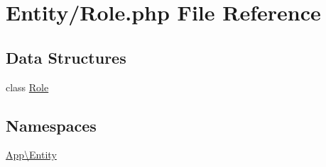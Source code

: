 \hypertarget{_role_8php}{}\section{Entity/\+Role.php File Reference}
\label{_role_8php}
\subsection*{Data Structures}
\begin{DoxyCompactItemize}
\item 
class \mbox{\hyperlink{class_app_1_1_entity_1_1_role}{Role}}
\end{DoxyCompactItemize}
\subsection*{Namespaces}
\begin{DoxyCompactItemize}
\item 
 \mbox{\hyperlink{namespace_app_1_1_entity}{App\textbackslash{}\+Entity}}
\end{DoxyCompactItemize}
